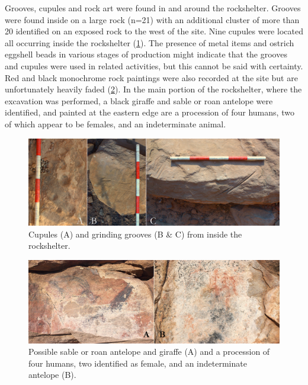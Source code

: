 Grooves, cupules and  rock art were found in and around the rockshelter. Grooves were found inside on a large rock (n=21) with an additional cluster of more than 20 identified on an exposed rock to the west of the site. 
Nine cupules were located all occurring inside the rockshelter (\cref{fig:Forssman-Figure13}). 
The presence of metal items and ostrich eggshell beads in various stages of production might indicate that 
the grooves and cupules were used in related activities, but this cannot be said with certainty. 
Red and black monochrome rock paintings were also recorded at the site but are unfortunately heavily faded (\cref{fig:Forssman-Figure14}).
In the main portion of the rockshelter, where the excavation was performed, a black giraffe and sable or roan antelope were identified, and painted at the eastern edge are a procession of four humans, two of which appear to be females, and an indeterminate animal. 

	\begin{figure} %
		\includegraphics[width=\linewidth]{figures/Forssman-Figure13}
		\caption{Cupules (A) and grinding grooves (B \& C) from inside the rockshelter.}
		\label{fig:Forssman-Figure13}
	\end{figure}
	
	\begin{figure} %
		\includegraphics[width=\linewidth]{figures/Forssman-Figure14}
		\caption{Possible sable or roan antelope and giraffe (A) and a procession of four humans, two identified as female, and an indeterminate antelope (B).}
		\label{fig:Forssman-Figure14}
	\end{figure}

